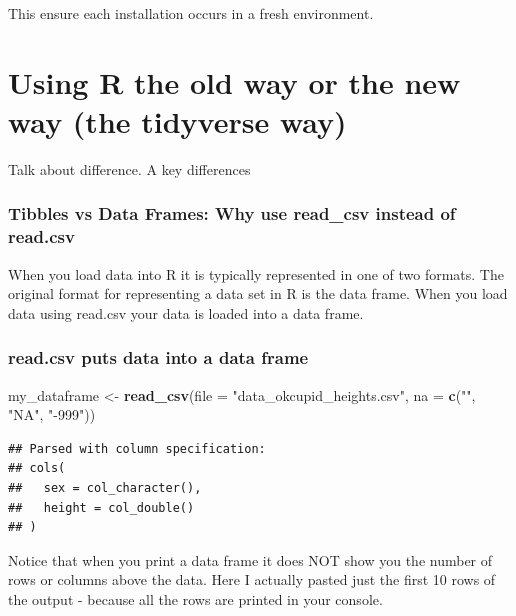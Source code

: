 \documentclass[
]{krantz}
\makeatletter
\newenvironment{Shaded}{\begin{snugshade}}{\end{snugshade}}
\newcommand{\DataTypeTok}[1]{\textcolor[rgb]{0.27,0.27,0.27}{#1}}
\newcommand{\KeywordTok}[1]{\textcolor[rgb]{0.27,0.27,0.27}{\textbf{#1}}}
\newcommand{\NormalTok}[1]{#1}
\newcommand{\StringTok}[1]{\textcolor[rgb]{0.5,0.5,0.5}{#1}}
\newenvironment{kframe}{%
\medskip{}
\setlength{\fboxsep}{.8em}
 \def\at@end@of@kframe{}%
 \ifinner\ifhmode%
  \def\at@end@of@kframe{\end{minipage}}%
  \begin{minipage}{\columnwidth}%
 \fi\fi%
 \def\FrameCommand##1{\hskip\@totalleftmargin \hskip-\fboxsep
 \colorbox{shadecolor}{##1}\hskip-\fboxsep
     \hskip-\linewidth \hskip-\@totalleftmargin \hskip\columnwidth}%
 \MakeFramed {\advance\hsize-\width
   \@totalleftmargin\z@ \linewidth\hsize
   \@setminipage}}%
 {\par\unskip\endMakeFramed%
 \at@end@of@kframe}
\renewenvironment{Shaded}{\begin{kframe}}{\end{kframe}}
\makeatother
\begin{document}
This ensure each installation occurs in a fresh environment.

\hypertarget{using-r-the-old-way-or-the-new-way-the-tidyverse-way}{%
\section{Using R the old way or the new way (the tidyverse way)}\label{using-r-the-old-way-or-the-new-way-the-tidyverse-way}}

Talk about difference. A key differences

\hypertarget{tibbles-vs-data-frames-why-use-read_csv-instead-of-read.csv}{%
\subsubsection{Tibbles vs Data Frames: Why use read\_csv instead of read.csv}\label{tibbles-vs-data-frames-why-use-read_csv-instead-of-read.csv}}

When you load data into R it is typically represented in one of two formats. The original format for representing a data set in R is the data frame. When you load data using read.csv your data is loaded into a data frame.

\hypertarget{read.csv-puts-data-into-a-data-frame}{%
\subsubsection{read.csv puts data into a data frame}\label{read.csv-puts-data-into-a-data-frame}}

\begin{Shaded}
\begin{Highlighting}[]
\NormalTok{my_dataframe <-}\StringTok{ }\KeywordTok{read_csv}\NormalTok{(}\DataTypeTok{file =} \StringTok{"data_okcupid_heights.csv"}\NormalTok{, }
                    \DataTypeTok{na =} \KeywordTok{c}\NormalTok{(}\StringTok{""}\NormalTok{, }\StringTok{"NA"}\NormalTok{, }\StringTok{"-999"}\NormalTok{))}
\end{Highlighting}
\end{Shaded}

\begin{verbatim}
## Parsed with column specification:
## cols(
##   sex = col_character(),
##   height = col_double()
## )
\end{verbatim}

Notice that when you print a data frame it does NOT show you the number of rows or columns above the data. Here I actually pasted just the first 10 rows of the output - because all the rows are printed in your console.
\end{document}
